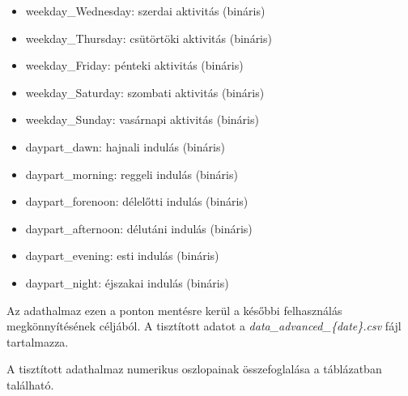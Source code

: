 \begin{itemize}
	\item weekday\_Wednesday: szerdai aktivitás (bináris)
	\item weekday\_Thursday: csütörtöki aktivitás (bináris)
	\item weekday\_Friday: pénteki aktivitás (bináris)
	\item weekday\_Saturday: szombati aktivitás (bináris)
	\item weekday\_Sunday: vasárnapi aktivitás (bináris)
	\item daypart\_dawn: hajnali indulás (bináris)
	\item daypart\_morning: reggeli indulás (bináris)
	\item daypart\_forenoon: délelőtti indulás (bináris)
	\item daypart\_afternoon: délutáni indulás (bináris)
	\item daypart\_evening: esti indulás (bináris)
	\item daypart\_night: éjszakai indulás (bináris)
\end{itemize}


Az adathalmaz ezen a ponton mentésre kerül a későbbi felhasználás megkönnyítésének céljából. A tisztított adatot a \textit{data\_advanced\_\{date\}.csv} fájl tartalmazza.


A tisztított adathalmaz numerikus oszlopainak összefoglalása a  táblázatban található.

